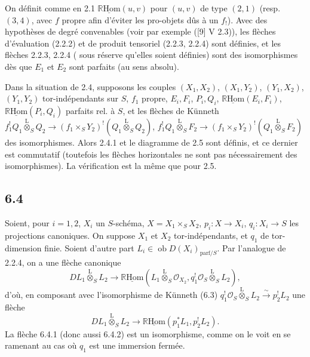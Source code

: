 \documentclass[11pt]{article}
\providecommand{\cO}{\mathcal{O}}
\newcommand{\R}{\mathbb{R}}\newcommand{\RHomCore}{\mathbb{R}\mathrm{Hom}}
\providecommand{\RHom}{\RHomCore}
\providecommand{\uRHom}{\underline{\RHom}}
\providecommand{\RHom}{\RHomCore}
\providecommand{\RHom}{\R\mathcal{H}om}
\providecommand{\R}{\mathrm R}
\providecommand{\RHom}{\RHomCore}
\begin{document}
On définit comme en 2.1 $\uRHom(u,v)$ pour $(u,v)$ de type $(2,1)$ (resp. $(3,4)$, avec $f$ propre afin d'éviter les pro-objets dûs à un $f_!$). Avec des hypothèses de degré convenables (voir par exemple ([9] V 2.3)), les flèches d'évaluation (2.2.2) et de produit tensoriel (2.2.3, 2.2.4) sont définies, et les flèches 
2.2.3, 2.2.4 (
sous réserve qu'elles soient définies) sont des isomorphismes dès que $E_1$ et $E_2$ sont parfaits (au sens absolu).

Dans la situation de 2.4, supposons les couples $(X_1,X_2)$, $(X_1,Y_2)$, $(Y_1,X_2)$, $(Y_1,Y_2)$ tor-indépendants sur $S$, $f_1$ propre, $E_i,F_i$, $P_i,Q_i$, $\uRHom(E_i,F_i)$, $\uRHom(P_i,Q_i)$ parfaits rel. à $S$, et les flèches de Künneth $f_1^!Q_1\overset{\mathrm{L}}{\otimes}_SQ_2\to(f_1\times_SY_2)^!(Q_1\overset{\mathrm{L}}{\otimes}_SQ_2)$, $f_1^!Q_1\overset{\mathrm{L}}{\otimes}_SF_2\to(f_1\times_SY_2)^!(Q_1\overset{\mathrm{L}}{\otimes}_SF_2)$ des isomorphismes. Alors 2.4.1 et le diagramme de 2.5 sont définis, et ce dernier est commutatif (toutefois les flèches horizontales ne sont pas nécessairement des isomorphismes). La vérification est la même que pour 2.5.

\subsection*{6.4}
Soient, pour $i=1,2$, $X_i$ un $S$-schéma, $X=X_1\times_SX_2$, $p_i:X\to X_i$, $q_i:X_i\to S$ les projections canoniques. On suppose $X_1$ et $X_2$ tor-indépendants, et $q_1$ de tor-dimension finie. Soient d'autre part $L_i\in\operatorname{ob}D(X_i)_{\mathrm{parf}/S}$. Par l'analogue de 2.2.4, on a une flèche canonique
\begin{equation}
\tag{6.4.1}
DL_1\overset{\mathrm{L}}{\otimes}_SL_2\longrightarrow \uRHom(L_1\overset{\mathrm{L}}{\otimes}_S\cO_{X_2},q_1^!\cO_S\overset{\mathrm{L}}{\otimes}_SL_2),
\end{equation}
d'où, en composant avec l'isomorphisme de Künneth (6.3) $q_1^!\cO_S\overset{\mathrm{L}}{\otimes}_SL_2\xrightarrow{\sim}p_2^!L_2$ une flèche
\begin{equation}
\tag{6.4.2}
DL_1\overset{\mathrm{L}}{\otimes}_SL_2\longrightarrow\uRHom(p_1^*L_1,p_2^!L_2).
\end{equation}
La flèche 6.4.1 (donc aussi 6.4.2) est un isomorphisme, comme on le voit en se ramenant au cas où $q_1$ est une immersion fermée.
\end{document}
